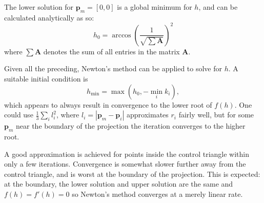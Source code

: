 \documentclass[]{interact}
\begin{document}


The lower solution for $\mathbf p_m = [0, 0]$ is a
global minimum for $h$, and can be calculated analytically as so:
\begin{equation}
  h_0 = \arccos \left(\frac{1}{\sqrt{\sum \mathbf A }} \right)^2
\end{equation}
where $\sum \mathbf A$ denotes the sum of all entries in the matrix $\mathbf A$.

Given all the preceding, Newton's method can be applied to solve for $h$.
A suitable initial condition is
\begin{equation}\label{eq:inverseh}
  h_{\min} = \max \left(h_0, -\min_i k_i \right),
\end{equation}
which appears to always result in convergence to the lower root of $f(h)$. One
could use $\frac{1}{3}\sum_i l^2_i$, where $l_i = |\mathbf p_m - \mathbf p_i|$
approximates $r_i$ fairly well, but for some $\mathbf p_m$ near the boundary
of the projection the iteration converges to the higher root.

A good approximation is achieved for points inside the control triangle within
only a few iterations. Convergence is somewhat slower further away from the
control triangle, and is worst at the boundary of the projection. This is
expected: at the boundary,
the lower solution and upper solution are the same and $f(h)=f'(h)=0$
so Newton's method converges at a merely linear rate.\citep{burden}
\end{document}
